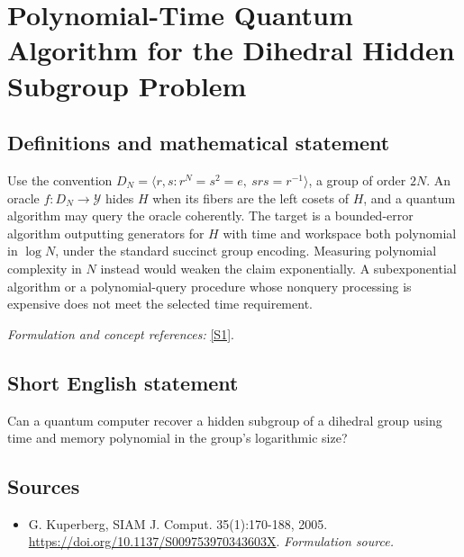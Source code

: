 \documentclass[11pt]{article}
\begin{document}
\section*{\texorpdfstring{Polynomial-Time Quantum Algorithm for the Dihedral Hidden Subgroup Problem}{Polynomial-Time Quantum Algorithm for the Dihedral Hidden Subgroup Problem}}\label{216}
\subsection{Definitions and mathematical statement}
Use the convention
$D_N=\langle r,s:r^N=s^2=e,\ srs=r^{-1}\rangle$, a group of order $2N$. An oracle $f:D_N\to\mathcal Y$ hides $H$ when its fibers are the left cosets of $H$, and a quantum algorithm may query the oracle coherently. The target is a bounded-error algorithm outputting generators for $H$ with time and workspace both polynomial in $\log N$, under the standard succinct group encoding. Measuring polynomial complexity in $N$ instead would weaken the claim exponentially. A subexponential algorithm or a polynomial-query procedure whose nonquery processing is expensive does not meet the selected time requirement.
\par\smallskip\textit{Formulation and concept references:} \href{https://doi.org/10.1137/S009753970343603X}{[S1]}.

\subsection{Short English statement}
Can a quantum computer recover a hidden subgroup of a dihedral group using time and memory polynomial in the group's logarithmic size?
\subsection{Sources}
\begin{itemize}
\item[S1]G. Kuperberg, SIAM J. Comput. 35(1):170-188, 2005.
\url{https://doi.org/10.1137/S009753970343603X}.
\textit{Formulation source.}
\end{itemize}
\end{document}
